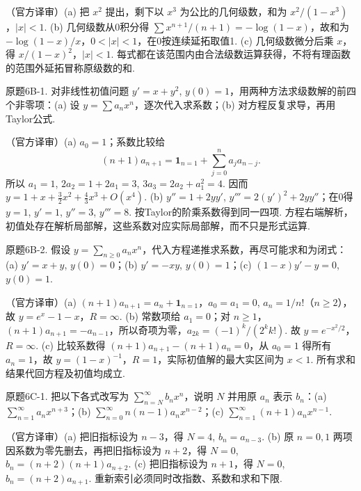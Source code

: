 \begin{solution}（官方译审）(a) 把 $x^2$ 提出，剩下以 $x^3$ 为公比的几何级数，和为 $x^2/(1-x^3)$，$|x|<1$. (b) 几何级数从0积分得 $\sum x^{n+1}/(n+1)=-\log(1-x)$，故和为 $-\log(1-x)/x$，$0<|x|<1$，在0按连续延拓取值1. (c) 几何级数微分后乘 $x$，得 $x/(1-x)^2$，$|x|<1$. 每式都在该范围内由合法级数运算获得，不将有理函数的范围外延拓冒称原级数的和.\end{solution}
\begin{exercise}\label{cw:bank-6B-1}原题6B-1. 对非线性初值问题 $y'=x+y^2$, $y(0)=1$，用两种方法求级数解的前四个非零项：(a) 设 $y=\sum a_nx^n$，逐次代入求系数；(b) 对方程反复求导，再用Taylor公式.\end{exercise}
\begin{solution}（官方译审）(a) $a_0=1$；系数比较给
\[(n+1)a_{n+1}=\mathbf1_{n=1}+\sum_{j=0}^na_ja_{n-j}.
\]
所以 $a_1=1$, $2a_2=1+2a_1=3$, $3a_3=2a_2+a_1^2=4$. 因而 $y=1+x+\frac32x^2+\frac43x^3+O(x^4)$. (b) $y''=1+2yy'$, $y'''=2(y')^2+2yy''$；在0得 $y=1$, $y'=1$, $y''=3$, $y'''=8$. 按Taylor的阶乘系数得到同一四项. 方程右端解析，初值处存在解析局部解，这些系数对应实际局部解，而不只是形式运算.\end{solution}
\begin{exercise}\label{cw:bank-6B-2}原题6B-2. 假设 $y=\sum_{n\ge0}a_nx^n$，代入方程递推求系数，再尽可能求和为闭式：(a) $y'=x+y$, $y(0)=0$；(b) $y'=-xy$, $y(0)=1$；(c) $(1-x)y'-y=0$, $y(0)=1$.\end{exercise}
\begin{solution}（官方译审）(a) $(n+1)a_{n+1}=a_n+\mathbf1_{n=1}$，$a_0=a_1=0$, $a_n=1/n!$（$n\ge2$），故 $y=e^x-1-x$，$R=\infty$. (b) 常数项给 $a_1=0$；对 $n\ge1$，$(n+1)a_{n+1}=-a_{n-1}$，所以奇项为零，$a_{2k}=(-1)^k/(2^kk!)$. 故 $y=e^{-x^2/2}$，$R=\infty$. (c) 比较系数得 $(n+1)a_{n+1}-(n+1)a_n=0$，从 $a_0=1$ 得所有 $a_n=1$，故 $y=(1-x)^{-1}$，$R=1$，实际初值解的最大实区间为 $x<1$. 所有求和结果代回方程及初值均成立.\end{solution}
\begin{exercise}\label{cw:bank-6C-1}原题6C-1. 把以下各式改写为 $\sum_{n=N}^\infty b_nx^n$，说明 $N$ 并用原 $a_n$ 表示 $b_n$：(a) $\sum_{n=1}^\infty a_nx^{n+3}$；(b) $\sum_{n=0}^\infty n(n-1)a_nx^{n-2}$；(c) $\sum_{n=1}^\infty(n+1)a_nx^{n-1}$.\end{exercise}
\begin{solution}（官方译审）(a) 把旧指标设为 $n-3$，得 $N=4$, $b_n=a_{n-3}$. (b) 原 $n=0,1$ 两项因系数为零先删去，再把旧指标设为 $n+2$，得 $N=0$, $b_n=(n+2)(n+1)a_{n+2}$. (c) 把旧指标设为 $n+1$，得 $N=0$, $b_n=(n+2)a_{n+1}$. 重新索引必须同时改指数、系数和求和下限.\end{solution}
